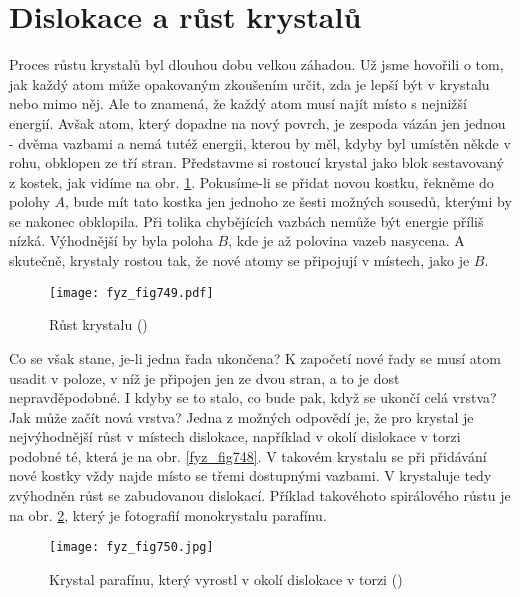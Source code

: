   \section{Dislokace a růst krystalů}\label{fyz:IIchapXXXsecVIII}
    Proces růstu krystalů byl dlouhou dobu velkou záhadou. Už jsme hovořili o tom, jak každý atom 
    může opakovaným zkoušením určit, zda je lepší být v krystalu nebo mimo něj. Ale to znamená, že 
    každý atom musí najít místo s nejnižší energií. Avšak atom, který dopadne na nový povrch, je 
    zespoda vázán jen jednou - dvěma vazbami a nemá tutéž energii, kterou by měl, kdyby byl umístěn 
    někde v rohu, obklopen ze tří stran. Představme si rostoucí krystal jako blok sestavovaný z 
    kostek, jak vidíme na obr. \ref{fyz_fig749}. Pokusíme-li se přidat novou kostku, řekněme do 
    polohy \(A\), bude mít tato kostka jen jednoho ze šesti možných sousedů, kterými by se nakonec 
    obklopila. Při tolika chybějících vazbách nemůže být energie příliš nízká. Výhodnější by byla 
    poloha \(B\), kde je až polovina vazeb nasycena. A skutečně, krystaly rostou tak, že nové atomy 
    se připojují v místech, jako je \(B\).
    
    \begin{figure}[ht!] %
      \centering
      \texttt{[image: fyz\_fig749.pdf]}
      \caption{Růst krystalu
               (\cite[s.~555]{Feynman02})}
      \label{fyz_fig749}
    \end{figure}

    Co se však stane, je-li jedna řada ukončena? K započetí nové řady se musí atom usadit v poloze, 
    v níž je připojen jen ze dvou stran, a to je dost nepravděpodobné. I kdyby se to stalo, co bude 
    pak, když se ukončí celá vrstva? Jak může začít nová vrstva? Jedna z možných odpovědí je, že 
    pro krystal je nejvýhodnější růst v místech dislokace, například v okolí dislokace v torzi 
    podobné té, která je na obr. \ref{fyz_fig748}. V takovém krystalu se při přidávání nové kostky 
    vždy najde místo se třemi dostupnými vazbami. V krystaluje tedy zvýhodněn růst se zabudovanou 
    dislokací. Příklad takovéhoto spirálového růstu je na obr. \ref{fyz_fig750}, který je 
    fotografií monokrystalu parafínu.
    
    \begin{figure}[ht!] %
      \centering
      \texttt{[image: fyz\_fig750.jpg]}
      \caption{Krystal parafínu, který vyrostl v okolí dislokace v torzi
               (\cite[s.~555]{Feynman02})}
      \label{fyz_fig750}
    \end{figure}

